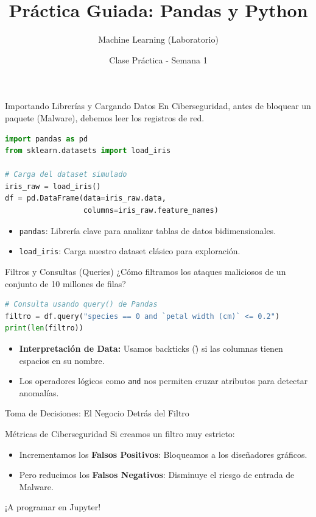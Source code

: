 \documentclass[aspectratio=169]{beamer}
\title{Práctica Guiada: Pandas y Python}
\subtitle{Machine Learning (Laboratorio)}
\author{Clase Práctica - Semana 1}
\date{}
\begin{document}
\begin{frame}
    \titlepage
\end{frame}

\begin{frame}[fragile]{Importando Librerías y Cargando Datos}
    En Ciberseguridad, antes de bloquear un paquete (Malware), debemos leer los registros de red.
    
\begin{lstlisting}[language=Python]
import pandas as pd
from sklearn.datasets import load_iris

# Carga del dataset simulado
iris_raw = load_iris()
df = pd.DataFrame(data=iris_raw.data, 
                  columns=iris_raw.feature_names)
\end{lstlisting}
    
    \begin{itemize}
        \item \texttt{pandas}: Librería clave para analizar tablas de datos bidimensionales.
        \item \texttt{load\_iris}: Carga nuestro dataset clásico para exploración.
    \end{itemize}
\end{frame}

\begin{frame}[fragile]{Filtros y Consultas (Queries)}
    ¿Cómo filtramos los ataques maliciosos de un conjunto de 10 millones de filas?
    
\begin{lstlisting}[language=Python]
# Consulta usando query() de Pandas
filtro = df.query("species == 0 and `petal width (cm)` <= 0.2")
print(len(filtro))
\end{lstlisting}
    
    \begin{itemize}
        \item \textbf{\textcolor{VerdeAzulado}{Interpretación de Data:}} Usamos backticks (\`) si las columnas tienen espacios en su nombre.
        \item Los operadores lógicos como \texttt{and} nos permiten cruzar atributos para detectar anomalías.
    \end{itemize}
\end{frame}

\begin{frame}{Toma de Decisiones: El Negocio Detrás del Filtro}
    \begin{alertblock}{Métricas de Ciberseguridad}
    Si creamos un filtro muy estricto:
    \begin{itemize}
        \item Incrementamos los \textbf{Falsos Positivos}: Bloqueamos a los diseñadores gráficos.
        \item Pero reducimos los \textbf{Falsos Negativos}: Disminuye el riesgo de entrada de Malware.
    \end{itemize}
    \end{alertblock}
    
    ¡A programar en Jupyter!
\end{frame}
\end{document}
